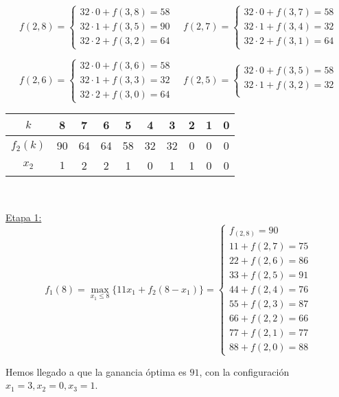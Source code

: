 \documentclass[twoside]{article}
\begin{document}
\begin{ejercicio}{2}
\begin{solucion}
$$f(2,8)=\begin{cases}
32\cdot 0+f(3,8)=58\\
32\cdot 1+f(3,5)=90\\
32\cdot 2+f(3,2)=64
\end{cases}\quad f(2,7)=\begin{cases}
32\cdot 0+f(3,7)=58\\
32\cdot 1+f(3,4)=32\\
32\cdot 2+f(3,1)=64
\end{cases}$$

$$f(2,6)=\begin{cases}
32\cdot 0+f(3,6)=58\\
32\cdot 1+f(3,3)=32\\
32\cdot 2+f(3,0)=64
\end{cases}\quad f(2,5)=\begin{cases}
32\cdot 0+f(3,5)=58\\
32\cdot 1+f(3,2)=32\\
\end{cases}$$
\begin{center}
\begin{tabular}{c| c c c c c c c c c}
$k$ & 8 & 7 & 6 & 5 & 4 & 3 & 2 & 1 & 0\\
\hline
$f_2(k)$ & 90 & 64 & 64 & 58 & 32 & 32 & 0 & 0 & 0\\
$x_2$ &  $1$ & 2 & 2 &    1&  0 & 1 &   1 & 0 & 0
\end{tabular}\
\end{center}
\underline{Etapa 1:}
$$f_1(8)=\max_{x_1\leq 8}\{11x_1+f_2(8-x_1)\}=\begin{cases}
f_(2,8)=90\\
11+f(2,7)=75\\
22+f(2,6)=86\\
33+f(2,5)=\boxed{91}\\
44+f(2,4)=76\\
55+f(2,3)=87\\
66+f(2,2)=66\\
77+f(2,1)=77\\
88+f(2,0)=88
\end{cases}$$

Hemos llegado a que la ganancia óptima es $91$, con la configuración $x_1=3,x_2=0, x_3=1$.
\end{solucion}

\end{ejercicio}
\end{document}
